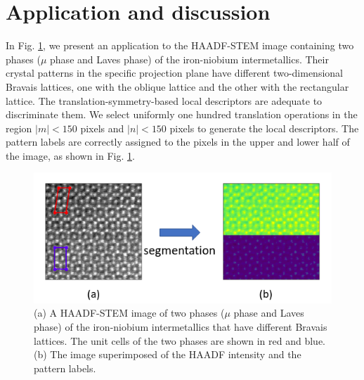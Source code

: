 \documentclass[twocolumn,amsmath, floatfix]{revtex4}
\begin{document}
\section{Application and discussion}\label{discussion}
In Fig. \ref{fig:FeNb_phase_boundary}, we present an application to the HAADF-STEM image containing two phases ($\mu$ phase and Laves phase) of the iron-niobium intermetallics. Their crystal patterns in the specific projection plane have different two-dimensional Bravais lattices, one with the oblique lattice and the other with the rectangular lattice. The translation-symmetry-based local descriptors are adequate to discriminate them. We select uniformly one hundred translation operations in the region $|m|<150$ pixels and $|n|<150$ pixels to generate the local descriptors. The pattern labels are correctly assigned to the pixels in the upper and lower half of the image, as shown in Fig. \ref{fig:FeNb_phase_boundary}. 
\begin{figure}
    \centering
    \includegraphics[width=1.\columnwidth]{FeNb_raw_and_segmented_images.png}
    \caption{(a) A HAADF-STEM image of two phases ($\mu$ phase and Laves phase) of the iron-niobium intermetallics that have different Bravais lattices. The unit cells of the two phases are shown in red and blue.  (b) The image superimposed of the HAADF intensity and the pattern labels.  }
    \label{fig:FeNb_phase_boundary}
\end{figure}
\end{document}
